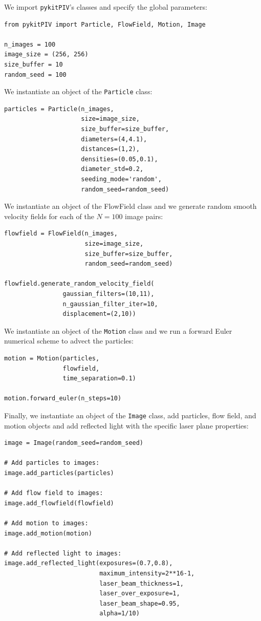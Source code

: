 \documentclass[a4paper,fleqn]{cas-dc}
\begin{document}
We import \texttt{pykitPIV}'s classes and specify the global parameters:
\lstset{language=Python}
\begin{lstlisting}
from pykitPIV import Particle, FlowField, Motion, Image

n_images = 100
image_size = (256, 256)
size_buffer = 10
random_seed = 100
\end{lstlisting}
We instantiate an object of the \texttt{Particle} class:
\lstset{language=Python}
\begin{lstlisting}
particles = Particle(n_images,
                     size=image_size,
                     size_buffer=size_buffer,
                     diameters=(4,4.1),
                     distances=(1,2),
                     densities=(0.05,0.1),
                     diameter_std=0.2,
                     seeding_mode='random',
                     random_seed=random_seed)
\end{lstlisting}
We instantiate an object of the FlowField class and we generate random smooth velocity fields for each of the $N=100$ image pairs:
\lstset{language=Python}
\begin{lstlisting}
flowfield = FlowField(n_images,
                      size=image_size,
                      size_buffer=size_buffer,
                      random_seed=random_seed)

flowfield.generate_random_velocity_field(
				gaussian_filters=(10,11),
				n_gaussian_filter_iter=10,
				displacement=(2,10))
\end{lstlisting}
We instantiate an object of the \texttt{Motion} class and we run a forward Euler numerical scheme to advect the particles:
\lstset{language=Python}
\begin{lstlisting}
motion = Motion(particles, 
                flowfield, 
                time_separation=0.1)
                
motion.forward_euler(n_steps=10)
\end{lstlisting}
Finally, we instantiate an object of the \texttt{Image} class, add particles, flow field, and motion objects and add reflected light with the specific laser plane properties:
\lstset{language=Python}
\begin{lstlisting}
image = Image(random_seed=random_seed)

# Add particles to images:
image.add_particles(particles)

# Add flow field to images:
image.add_flowfield(flowfield)

# Add motion to images:        
image.add_motion(motion)

# Add reflected light to images:
image.add_reflected_light(exposures=(0.7,0.8),
                          maximum_intensity=2**16-1,
                          laser_beam_thickness=1,
                          laser_over_exposure=1,
                          laser_beam_shape=0.95,
                          alpha=1/10)
\end{lstlisting}
\end{document}
